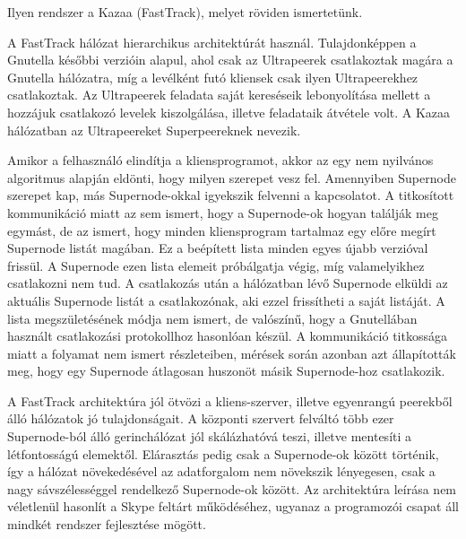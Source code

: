 \documentclass[a4paper]{article}
\begin{document}
Ilyen rendszer a Kazaa (FastTrack), melyet röviden ismertetünk.

A FastTrack hálózat hierarchikus architektúrát használ. Tulajdonképpen a Gnutella későbbi verzióin alapul, ahol csak az Ultrapeerek csatlakoztak magára a Gnutella hálózatra, míg a levélként futó kliensek csak ilyen Ultrapeerekhez csatlakoztak. Az Ultrapeerek feladata saját kereséseik lebonyolítása mellett a hozzájuk csatlakozó levelek kiszolgálása, illetve feladataik átvétele volt. A Kazaa hálózatban az Ultrapeereket Superpeereknek nevezik.

Amikor a felhasználó elindítja a kliensprogramot, akkor az egy nem nyilvános algoritmus alapján eldönti, hogy milyen szerepet vesz fel. Amennyiben Supernode szerepet kap, más Supernode-okkal igyekszik felvenni a kapcsolatot. A titkosított kommunikáció miatt az sem ismert, hogy a Supernode-ok hogyan találják meg egymást, de az ismert, hogy minden kliensprogram tartalmaz egy előre megírt Supernode listát magában. Ez a beépített lista minden egyes újabb verzióval frissül. A Supernode ezen lista elemeit próbálgatja végig, míg valamelyikhez csatlakozni nem tud. A csatlakozás után a hálózatban lévő Supernode elküldi az aktuális Supernode listát a csatlakozónak, aki ezzel frissítheti a saját listáját. A lista megszületésének módja nem ismert, de valószínű, hogy a Gnutellában használt csatlakozási protokollhoz hasonlóan készül. A kommunikáció titkossága miatt a folyamat nem ismert részleteiben, mérések során azonban azt állapították meg, hogy egy Supernode átlagosan huszonöt másik Supernode-hoz csatlakozik.

A FastTrack architektúra jól ötvözi a kliens-szerver, illetve egyenrangú peerekből álló hálózatok jó tulajdonságait. A központi szervert felváltó több ezer Supernode-ból álló gerinchálózat jól skálázhatóvá teszi, illetve mentesíti a létfontosságú elemektől. Elárasztás pedig csak a Supernode-ok között történik, így a hálózat növekedésével az adatforgalom nem növekszik lényegesen, csak a nagy sávszélességgel rendelkező Supernode-ok között. Az architektúra leírása nem véletlenül hasonlít a Skype feltárt működéséhez, ugyanaz a programozói csapat áll mindkét rendszer fejlesztése mögött. 
\end{document}

